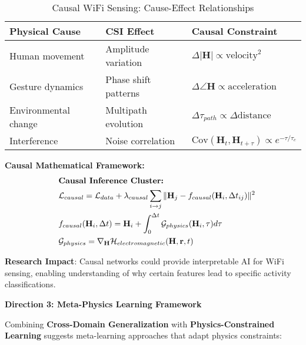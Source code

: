 \documentclass[journal]{IEEEtran}
\begin{document}
\begin{table}[h]
\centering
\caption{Causal WiFi Sensing: Cause-Effect Relationships}
\label{tab:causal_relationships}
\begin{tabular}{|l|l|l|}
\hline
\textbf{Physical Cause} & \textbf{CSI Effect} & \textbf{Causal Constraint} \\
\hline
Human movement & Amplitude variation & $\Delta|\mathbf{H}| \propto \text{velocity}^2$ \\
Gesture dynamics & Phase shift patterns & $\Delta\angle\mathbf{H} \propto \text{acceleration}$ \\
Environmental change & Multipath evolution & $\Delta\tau_{path} \propto \Delta\text{distance}$ \\
Interference & Noise correlation & $\text{Cov}(\mathbf{H}_t, \mathbf{H}_{t+\tau}) \propto e^{-\tau/\tau_c}$ \\
\hline
\end{tabular}
\end{table}

\textbf{Causal Mathematical Framework:}
\begin{align}
&\hspace{2em} \text{\textbf{Causal Inference Cluster:}} \quad &  \nonumber \\
&\hspace{2em} \mathcal{L}_{causal} = \mathcal{L}_{data} + \lambda_{causal} \sum_{i \rightarrow j} \|\mathbf{H}_j - f_{causal}(\mathbf{H}_i, \Delta t_{ij})\|^2 \label{eq:causal_loss} \\
&\hspace{2em} f_{causal}(\mathbf{H}_i, \Delta t) = \mathbf{H}_i + \int_0^{\Delta t} \mathcal{G}_{physics}(\mathbf{H}_i, \tau) d\tau \label{eq:causal_evolution} \\
&\hspace{2em} \mathcal{G}_{physics} = \nabla_{\mathbf{H}} \mathcal{H}_{electromagnetic}(\mathbf{H}, \mathbf{r}, t) \label{eq:physics_generator}
\end{align}

\textbf{Research Impact}: Causal networks could provide interpretable AI for WiFi sensing, enabling understanding of why certain features lead to specific activity classifications.

\textbf{Direction 3: Meta-Physics Learning Framework}

Combining \textbf{Cross-Domain Generalization} with \textbf{Physics-Constrained Learning} suggests meta-learning approaches that adapt physics constraints:
\end{document}

